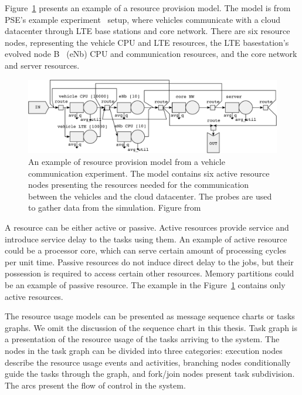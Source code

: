 Figure~\ref{fig:resource-provision-model} presents an example of a resource provision model. The model is from PSE's example experiment~\cite{Hanhirova:2014:PSE} setup, where vehicles communicate with a cloud datacenter through LTE base stations and core network. There are six resource nodes, representing the vehicle CPU and LTE resources, the LTE basestation's evolved node B~\cite{Sesia:2009:LTE} (eNb) CPU and communication resources, and the core network and server resources.

\begin{figure}[]
  \begin{center}
    \includegraphics[width=\textwidth]{images/pse-models/pse-rn-example.pdf}
    \caption{An example of resource provision model from a vehicle communication experiment. The model contains six active resource nodes presenting the resources needed for the communication between the vehicles and the cloud datacenter. The probes are used to gather data from the simulation. Figure from~\cite{Hanhirova:2014:PSE}}
    \label{fig:resource-provision-model}
  \end{center}
\end{figure}

A resource can be either active or passive. Active resources provide service and introduce service delay to the tasks using them. An example of active resource could be a processor core, which can serve certain amount of processing cycles per unit time. Passive resources do not induce direct delay to the jobs, but their possession is required to access certain other resources. Memory partitions could be an example of passive resource. The example in the Figure~\ref{fig:resource-provision-model} contains only active resources.

The resource usage models can be presented as message sequence charts or tasks graphs. We omit the discussion of the sequence chart in this thesis. Task graph is a presentation of the resource usage of the tasks arriving to the system. The nodes in the task graph can be divided into three categories: execution nodes describe the resource usage events and activities, branching nodes conditionally guide the tasks through the graph, and fork/join nodes present task subdivision. The arcs present the flow of control in the system.

